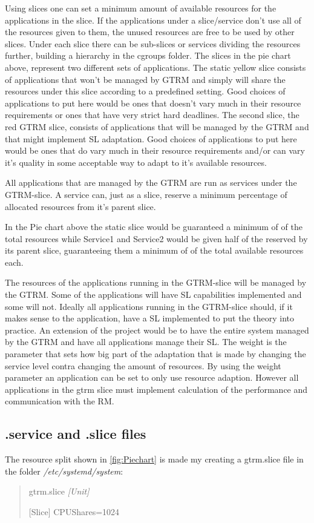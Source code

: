 \documentclass[nobiblatex]{LTHthesis}
\begin{document}
Using slices one can set a minimum amount of available resources for the applications in the slice. If the applications under a slice/service don’t use all of the resources given to them, the unused resources are free to be used by other slices. Under each slice there can be sub-slices or services dividing the resources further, building a hierarchy in the cgroups folder. The slices in the pie chart above, represent two different sets of applications. The static yellow slice consists of applications that won’t be managed by GTRM and simply will share the resources under this slice according to a predefined setting. Good choices of applications to put here would be ones that doesn’t vary much in their resource requirements or ones that have very strict hard deadlines. The second slice, the red GTRM slice, consists of applications that will be managed by the GTRM and that might implement SL adaptation. Good choices of applications to put here would be ones that do vary much in their resource requirements and/or can vary it’s quality in some acceptable way to adapt to it’s available resources.

All applications that are managed by the GTRM are run as services under the GTRM-slice. A service can, just as a slice, reserve a minimum percentage of allocated resources from it’s parent slice.

In the Pie chart above the static slice would be guaranteed a minimum of  of the total resources while Service1 and Service2 would be given half of the  reserved by its parent slice, guaranteeing  them a minimum of  of the total available resources each.

The resources of the applications running in the GTRM-slice will be managed by the GTRM. Some of the applications will have SL capabilities implemented and some will not. Ideally all applications running in the GTRM-slice should, if it makes sense to the application, have a SL implemented to put the theory into practice. An extension of the project would be to have the entire system managed by the GTRM and have all applications manage their SL. The weight is the parameter that sets how big part of the adaptation that is made by changing the service level contra changing the amount of resources. By using the weight parameter an application can be set to only use resource adaption. However all applications in the gtrm slice must implement calculation of the performance and communication with the RM.


\subsection{.service and .slice files}
The resource split shown in \ref{fig:Piechart} is made my creating a gtrm.slice file in the folder \emph{/etc/systemd/system}:
\begin{quotation}
gtrm.slice
\em
[Unit]

[Slice]
CPUShares=1024
\end{quotation}
\end{document}
